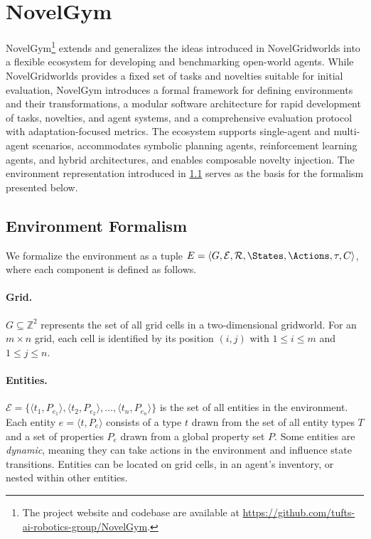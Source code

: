 \section{NovelGym}
\label{sec:novelgym}

NovelGym\footnote{The project website and codebase are available at \url{https://github.com/tufts-ai-robotics-group/NovelGym}.} extends and generalizes the ideas introduced in NovelGridworlds into a flexible ecosystem for developing and benchmarking open-world agents. While NovelGridworlds provides a fixed set of tasks and novelties suitable for initial evaluation, NovelGym introduces a formal framework for defining environments and their transformations, a modular software architecture for rapid development of tasks, novelties, and agent systems, and a comprehensive evaluation protocol with adaptation-focused metrics. The ecosystem supports single-agent and multi-agent scenarios, accommodates symbolic planning agents, reinforcement learning agents, and hybrid architectures, and enables composable novelty injection. The environment representation introduced in \cref{sec:ng_environment} serves as the basis for the formalism presented below.

\subsection{Environment Formalism}
\label{sec:ng_environment}

We formalize the environment as a tuple $E = \langle G, \mathcal{E}, \mathcal{R}, \States, \Actions, \tau, C \rangle$, where each component is defined as follows.

\paragraph{Grid.} $G \subseteq \mathbb{Z}^2$ represents the set of all grid cells in a two-dimensional gridworld. For an $m \times n$ grid, each cell is identified by its position $(i, j)$ with $1 \leq i \leq m$ and $1 \leq j \leq n$.

\paragraph{Entities.} $\mathcal{E} = \{\langle t_1, P_{e_1} \rangle, \langle t_2, P_{e_2} \rangle, \ldots, \langle t_n, P_{e_n} \rangle\}$ is the set of all entities in the environment. Each entity $e = \langle t, P_e \rangle$ consists of a type $t$ drawn from the set of all entity types $T$ and a set of properties $P_e$ drawn from a global property set $P$. Some entities are \emph{dynamic}, meaning they can take actions in the environment and influence state transitions. Entities can be located on grid cells, in an agent's inventory, or nested within other entities.

